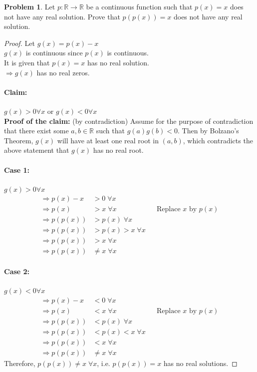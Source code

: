 \documentclass[14]{article}
\theoremstyle{definition}
\newtheorem{prob}{Problem}
\theoremstyle{case}
\begin{document}
\begin{prob}
Let $p:\mathbb{R}\to \mathbb{R}$ be a continuous function such that $p(x) = x$ does not have any real solution. Prove that $p(p(x)) = x$ does not have any real solution.
\begin{proof}
Let $g(x) = p(x) - x$\\
$g(x)$ is continuous since $p(x)$ is continuous.\\
It is given that $p(x) = x$ has no real solution.\\
$\Rightarrow g(x)$ has no real zeros.
\paragraph{Claim: }$g(x) > 0 \forall x$ or $g(x) < 0 \forall x$\\
\textbf{Proof of the claim: }(by contradiction)
Assume for the purpose of contradiction that there exist some $a,b \in \mathbb{R}$ such that $g(a)g(b) < 0$. Then by Bolzano's Theorem, $g(x)$ will have at least one real root in $(a, b)$, which contradicts the above statement that $g(x)$ has no real root.\\
\paragraph{Case 1:} $g(x) > 0 \forall x$\\
\begin{align*}
\Rightarrow p(x) - x &> 0 \; \forall x\\
\Rightarrow p(x) &> x \; \forall x && \text{Replace } x \text{ by } p(x)\\
\Rightarrow p(p(x)) &> p(x)\; \forall x\\
\Rightarrow p(p(x)) &> p(x) > x\; \forall x\\
\Rightarrow p(p(x)) &> x \;\forall x\\
\Rightarrow p(p(x)) &\neq x \;\forall x
\end{align*}
\paragraph{Case 2:} $g(x) < 0 \forall x$\\
\begin{align*}
\Rightarrow p(x) - x &< 0 \; \forall x\\
\Rightarrow p(x) &< x \; \forall x && \text{Replace } x \text{ by } p(x)\\
\Rightarrow p(p(x)) &< p(x)\; \forall x\\
\Rightarrow p(p(x)) &< p(x) < x\; \forall x\\
\Rightarrow p(p(x)) &< x \;\forall x\\
\Rightarrow p(p(x)) &\neq x \;\forall x
\end{align*}
Therefore, $p(p(x)) \neq x \;\forall x$, i.e. $p(p(x)) = x$ has no real solutions.
\end{proof}
\end{prob}
\pagebreak
\end{document}
